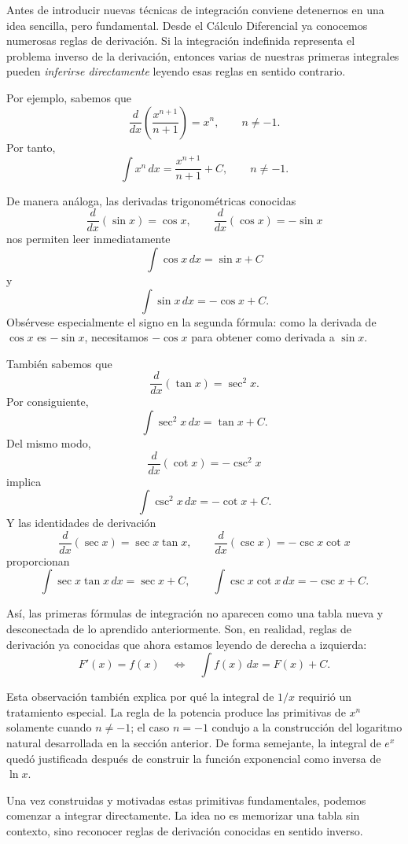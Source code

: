 \documentclass[12pt]{article}
\theoremstyle{definition}\newtheorem{definicion}[teorema]{Definición}\newtheorem{ejemplo}[teorema]{Ejemplo}\newtheorem{ejercicio}[teorema]{Ejercicio}
\theoremstyle{remark}\newtheorem*{observacion}{Observación}\newtheorem*{advertencia}{Advertencia}\newtheorem*{estrategia}{Estrategia}
\begin{document}
Antes de introducir nuevas técnicas de integración conviene detenernos en una idea sencilla, pero fundamental. Desde el Cálculo Diferencial ya conocemos numerosas reglas de derivación. Si la integración indefinida representa el problema inverso de la derivación, entonces varias de nuestras primeras integrales pueden \emph{inferirse directamente} leyendo esas reglas en sentido contrario.

Por ejemplo, sabemos que
\[
\frac{d}{dx}\left(\frac{x^{n+1}}{n+1}\right)=x^n,
\qquad n\neq -1.
\]
Por tanto,
\[
\boxed{\int x^n\,dx=\frac{x^{n+1}}{n+1}+C,\qquad n\neq-1.}
\]

De manera análoga, las derivadas trigonométricas conocidas
\[
\frac{d}{dx}(\sin x)=\cos x,
\qquad
\frac{d}{dx}(\cos x)=-\sin x
\]
nos permiten leer inmediatamente
\[
\boxed{\int\cos x\,dx=\sin x+C}
\]
y
\[
\boxed{\int\sin x\,dx=-\cos x+C.}
\]
Obsérvese especialmente el signo en la segunda fórmula: como la derivada de $\cos x$ es $-\sin x$, necesitamos $-\cos x$ para obtener como derivada a $\sin x$.

También sabemos que
\[
\frac{d}{dx}(\tan x)=\sec^2x.
\]
Por consiguiente,
\[
\boxed{\int\sec^2x\,dx=\tan x+C.}
\]
Del mismo modo,
\[
\frac{d}{dx}(\cot x)=-\csc^2x
\]
implica
\[
\boxed{\int\csc^2x\,dx=-\cot x+C.}
\]
Y las identidades de derivación
\[
\frac{d}{dx}(\sec x)=\sec x\tan x,
\qquad
\frac{d}{dx}(\csc x)=-\csc x\cot x
\]
proporcionan
\[
\boxed{\int\sec x\tan x\,dx=\sec x+C,}
\qquad
\boxed{\int\csc x\cot x\,dx=-\csc x+C.}
\]

Así, las primeras fórmulas de integración no aparecen como una tabla nueva y desconectada de lo aprendido anteriormente. Son, en realidad, reglas de derivación ya conocidas que ahora estamos leyendo de derecha a izquierda:
\[
\boxed{F'(x)=f(x)\quad\Longleftrightarrow\quad \int f(x)\,dx=F(x)+C.}
\]

Esta observación también explica por qué la integral de $1/x$ requirió un tratamiento especial. La regla de la potencia produce las primitivas de $x^n$ solamente cuando $n\neq-1$; el caso $n=-1$ condujo a la construcción del logaritmo natural desarrollada en la sección anterior. De forma semejante, la integral de $e^x$ quedó justificada después de construir la función exponencial como inversa de $\ln x$.

Una vez construidas y motivadas estas primitivas fundamentales, podemos comenzar a integrar directamente. La idea no es memorizar una tabla sin contexto, sino reconocer reglas de derivación conocidas en sentido inverso.
\end{document}
